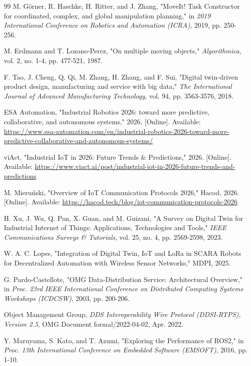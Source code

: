 \begin{thebibliography}{99}
 M. G{\"o}rner, R. Haschke, H. Ritter, and J. Zhang, "MoveIt! Task Constructor for coordinated, complex, and global manipulation planning," in \textit{2019 International Conference on Robotics and Automation (ICRA)}, 2019, pp. 250-256.

 M. Erdmann and T. Lozano-Perez, "On multiple moving objects," \textit{Algorithmica}, vol. 2, no. 1-4, pp. 477-521, 1987.

 F. Tao, J. Cheng, Q. Qi, M. Zhang, H. Zhang, and F. Sui, "Digital twin-driven product design, manufacturing and service with big data," \textit{The International Journal of Advanced Manufacturing Technology}, vol. 94, pp. 3563-3576, 2018.

 ESA Automation, "Industrial Robotics 2026: toward more predictive, collaborative, and autonomous systems," 2026. [Online]. Available: \url{https://www.esa-automation.com/en/industrial-robotics-2026-toward-more-predictive-collaborative-and-autonomous-systems/}

 viAct, "Industrial IoT in 2026: Future Trends \& Predictions," 2026. [Online]. Available: \url{https://www.viact.ai/post/industrial-iot-in-2026-future-trends-and-predictions}

 M. Mieru{\'n}ski, "Overview of IoT Communication Protocols 2026," Hacod, 2026. [Online]. Available: \url{https://hacod.tech/blog/iot-communication-protocols-2026}

 H. Xu, J. Wu, Q. Pan, X. Guan, and M. Guizani, "A Survey on Digital Twin for Industrial Internet of Things: Applications, Technologies and Tools," \textit{IEEE Communications Surveys \& Tutorials}, vol. 25, no. 4, pp. 2569-2598, 2023.

 W. A. C. Lopes, "Integration of Digital Twin, IoT and LoRa in SCARA Robots for Decentralized Automation with Wireless Sensor Networks," MDPI, 2025.

 G. Pardo-Castellote, "OMG Data-Distribution Service: Architectural Overview," in \textit{Proc. 23rd IEEE International Conference on Distributed Computing Systems Workshops (ICDCSW)}, 2003, pp. 200-206.

 Object Management Group, \textit{DDS Interoperability Wire Protocol (DDSI-RTPS), Version 2.5}, OMG Document formal/2022-04-02, Apr. 2022.

 Y. Maruyama, S. Kato, and T. Azumi, "Exploring the Performance of ROS2," in \textit{Proc. 13th International Conference on Embedded Software (EMSOFT)}, 2016, pp. 1-10.


\end{thebibliography}
